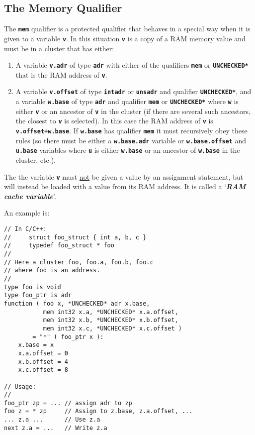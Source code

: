 \documentclass[12pt]{article}
\makeatletter
\newcommand{\TT}[1]{{\tt \bfseries #1}}
\newcommand{\key}[1]{{\bf \em #1}\index{#1}}
\newcommand{\ttkey}[1]{\TT{#1}\index{#1@{\tt #1}}}
\newenvironment{indpar}[1][0.3in]%
	{\begin{list}{}%
		     {\setlength{\itemsep}{0in}%
		      \setlength{\topsep}{0in}%
		      \setlength{\parsep}{1ex}%
		      \setlength{\labelwidth}{#1}%
		      \setlength{\leftmargin}{#1}%
		      \addtolength{\leftmargin}{\labelsep}}%
	 \item}%
	{\end{list}}
\makeatother
\begin{document}
\subsection{The Memory Qualifier}
\label{THE-MEM-QUALIFIER}

The \ttkey{mem} qualifier is a protected qualifier that behaves
in a special way when it is given to a variable \TT{v}.
In this situation \TT{v} is a copy of a RAM memory value and
must be in a cluster that
has either:
\begin{enumerate}
\item
A variable \TT{v.adr} of type \TT{adr} with either of the qualifiers
\TT{mem} or \TT{*UNCHECKED*} that is the RAM address of \TT{v}.

\item
A variable \TT{v.offset} of type \TT{intadr} or \TT{unsadr} and
qualifier \TT{*UNCHECKED*}, and
a variable \TT{w.base} of type \TT{adr} and qualifier \TT{mem}
or \TT{*UNCHECKED*} where \TT{w} is either \TT{v} or an ancestor
of \TT{v} in the cluster (if there are several such ancestors, the
closest to \TT{v} is selected).
In this case the RAM address of \TT{v} is \TT{v.offset+w.base}.
If \TT{w.base} has qualifier \TT{mem} it must recursively obey these
rules (so there must be either a \TT{w.base.adr} variable
or \TT{w.base.offset} and \TT{u.base} variables where \TT{u}
is either \TT{w.base} or an ancestor of \TT{w.base} in the cluster, etc.).
\end{enumerate}
The the
variable \TT{v} must \underline{not} be given a value by an
assignment statement, but will instead be loaded with a value
from its RAM address.  It is called a `\key{RAM cache variable}'.

An example is:

\begin{indpar}\begin{verbatim}
// In C/C++:
//     struct foo_struct { int a, b, c }
//     typedef foo_struct * foo
//
// Here a cluster foo, foo.a, foo.b, foo.c
// where foo is an address.
//
type foo is void
type foo_ptr is adr
function ( foo x, *UNCHECKED* adr x.base,
           mem int32 x.a, *UNCHECKED* x.a.offset,
           mem int32 x.b, *UNCHECKED* x.b.offset,
           mem int32 x.c, *UNCHECKED* x.c.offset )
        = "*" ( foo_ptr x ):
    x.base = x
    x.a.offset = 0
    x.b.offset = 4
    x.c.offset = 8

// Usage:
//
foo_ptr zp = ... // assign adr to zp
foo z = * zp     // Assign to z.base, z.a.offset, ...
... z.a ...      // Use z.a
next z.a = ...   // Write z.a

\end{verbatim}\end{indpar}
\end{document}
